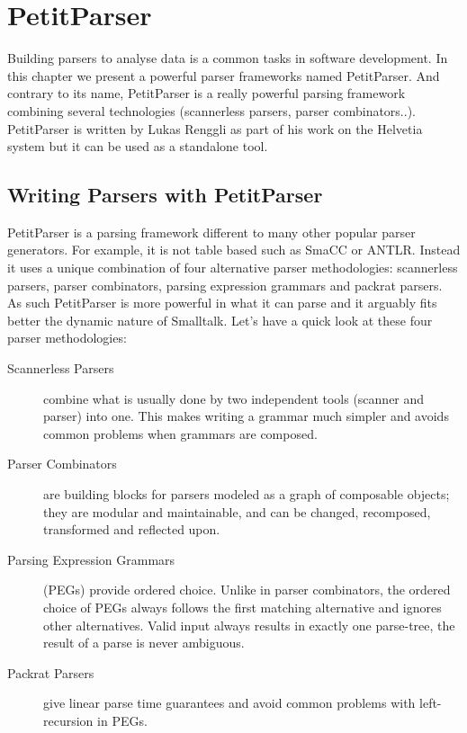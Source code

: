 \documentclass[a4paper,10pt,twoside]{book}
\begin{document}
\fi
\sloppy
\chapter{PetitParser}

\chapterauthor{\authorlukas{}}

Building parsers to analyse data is a common tasks in software development. In this chapter we present a powerful parser frameworks named PetitParser. And contrary to its name, PetitParser is a really powerful parsing framework combining several technologies (scannerless parsers, parser combinators..).
PetitParser is written by Lukas Renggli  as part of his work on the Helvetia system but it can be used as a standalone tool.



\section{Writing Parsers with PetitParser}

 PetitParser is a parsing framework different
to many other popular parser generators. For example, it is not table
based such as SmaCC or ANTLR. Instead it uses a unique combination of
four alternative parser methodologies: scannerless parsers, parser
combinators, parsing expression grammars and packrat parsers. As such
PetitParser is more powerful in what it can parse and it arguably fits
better the dynamic nature of Smalltalk. Let's have a quick look at
these four parser methodologies:

\begin{description}
\item[Scannerless Parsers] combine what is usually done by two
  independent tools (scanner and parser) into one. This makes writing
  a grammar much simpler and avoids common problems when grammars are
  composed.

\item[Parser Combinators] are building blocks for parsers modeled as a
  graph of composable objects; they are modular and maintainable, and
  can be changed, recomposed, transformed and reflected upon.

\item[Parsing Expression Grammars] (PEGs) provide ordered choice. Unlike in
  parser combinators, the ordered choice of PEGs always follows the
  first matching alternative and ignores other alternatives. Valid
  input always results in exactly one parse-tree, the result of a
  parse is never ambiguous.

\item[Packrat Parsers] give linear parse time guarantees and avoid
  common problems with left-recursion in PEGs.
\end{description}
\end{document}
